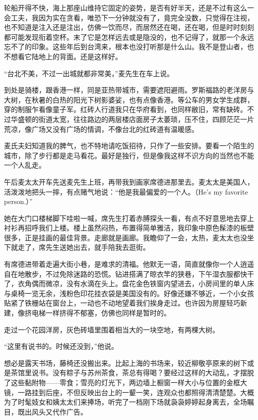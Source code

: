 \par 轮船开得不快，海上那座山维持它固定的姿势，是否有好半天，还是不过有这么一会工夫，我因为实在贪看，唯恐下一分钟就没有了，竟完全没数，只觉得在注视，也不知道是注入还是注出，仿佛一饮而尽，而居然还在喝，还在喝，但是时时刻刻都可能发现衔着空杯。末了它是怎样远去或是隐没的，也不记得了，就那一个永远忘不了的印象。这些年后到台湾来，根本也没打听那是什么山。我不是登山者，也不想看它陆地上的背面。还是这样好。
\par “台北不美，不过一出城就都非常美，”麦先生在车上说。
\par 到处是骑楼，跟香港一样，同是亚热带城市，需要遮阳避雨。罗斯福路的老洋房与大树，在秋暑的白热的阳光下树影婆娑，也有点像香港。等公车的男女学生成群，穿的制服乍看像童子军。红砖人行道我只在华府看到，也同样敝旧，常有缺砖。不过华盛顿的街道太宽，往往路边的两层楼店面房子太萎琐，压不住，四顾茫茫一片荒凉，像广场又没有广场的情调，不像台北的红砖道有温暖感。
\par 麦氏夫妇知道我的脾气，也不特地请吃饭招待，只作了一些安排。要看一个陌生的城市，除了步行都是走马看花。最好是独行，但是像我这样不识方向的当然也不能一个人乱走。
\par 午后麦太太开车先送麦先生上班，再带我到画家席德进那里去。麦太太是美国人，活泼泼地把头一摔，有点赌气地说：“他是我最偏爱的一个人。（He's my favorite person.）”
\par 她在大门口楼梯脚下哇啦一喊，席先生打着赤膊探头一看，有点不好意思地去穿上衬衫再招呼我们上楼。楼上虽然闷热，布置得简单雅洁，我印象中原色髹漆的板壁很多，正是挂画的最佳背景。走廊就是画廊。我瞻仰了一会，太热，麦太太也没坐下就走了，席先生送她出去，就手陪我去逛街。
\par 有席德进带着走遍大街小巷，是难求的清福。他默无一语，简直就像你一个人逍遥自在地散步，不过免除迷路的恐慌。钻进搭满了晾衣竿的狭巷，下午湿衣服都快干了，衣角偶而微凉，没有水滴在头上。盘花金色铁窗内望进去，小房间里的单人床与桌椅一览无余，浅粉色印花挂衣袋是美国没有的。好像还嫌不够近，一个小女孩贴紧了铁栅站在窗台上，一动也不动地望着我们挨身走过。也许因为房屋轻巧新建，像挤电梯一样挤得不郁塞，仿佛也同样是暂时的。
\par 走过一个花园洋房，灰色砖墙里围着相当大的一块空地，有两棵大树。
\par “这里有说书的。时候还没到，”他说。
\par 想必是露天书场，藤椅还没搬出来。比起上海的书场来，较近柳敬亭原来的树下或是茶馆里说书。没有粽子与苏州茶食，茶总有得喝？要经过这样的大动乱，才摆脱了这些黏附物——零食；雪亮的灯光下，两边墙上橱窗一样大小与位置的金框大镜，一路挂到后座，不但反映出台上的一颦一笑，连观众也都照得清清楚楚。大概为了时髦妓女和姨太太们来捧场，听完了一档刚下场就袅袅婷婷起身离去，全场瞩目，既出风头又代作广告。
